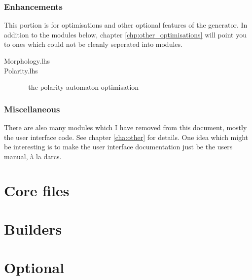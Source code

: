 \documentclass[a4paper,11pt]{report}
\begin{document}
\section{Enhancements}

This portion is for optimisations and other optional features of the
generator.
In addition to the modules below, chapter \ref{chp:other_optimisations}
will point you to ones which could not be cleanly seperated into
modules.

\begin{description}
 \item[Morphology.lhs]
 \item[Polarity.lhs]   - the polarity automaton optimisation 
\end{description}

\section{Miscellaneous}

There are also many modules which I have removed from this document,
mostly the user interface code.  See chapter \ref{cha:other} for
details.  One idea which might be interesting is to make the user
interface documentation just be the users manual, \`a la darcs.




\part{Core files}







\part{Builders}
\label{prt:builders}




\part{Optional}
\end{document}
